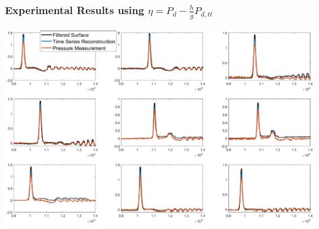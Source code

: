 
\begin{frame}[t]\frametitle{Experimental Results using \(\eta = P_d - \frac{h}{g}P_{d,tt}\)}
	\includegraphics[height=.9\textheight]{images/nine_experiments_run.eps}
\end{frame}

